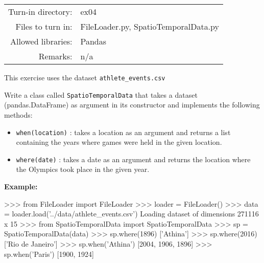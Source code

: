 \documentclass[]{article}
\newenvironment{Shaded}{\begin{snugshade}}{\end{snugshade}}
\newcommand{\DecValTok}[1]{\textcolor[rgb]{0.96,0.45,0.00}{#1}}
\newcommand{\ImportTok}[1]{\textcolor[rgb]{0.15,0.68,0.38}{#1}}
\newcommand{\NormalTok}[1]{\textcolor[rgb]{0.81,0.81,0.76}{#1}}
\newcommand{\OperatorTok}[1]{\textcolor[rgb]{0.81,0.81,0.76}{#1}}
\newcommand{\StringTok}[1]{\textcolor[rgb]{0.96,0.31,0.31}{#1}}
\begin{document}
\begin{longtable}[]{@{}rl@{}}
\toprule
\endhead
Turn-in directory: & ex04\tabularnewline
Files to turn in: & FileLoader.py, SpatioTemporalData.py\tabularnewline
Allowed libraries: & Pandas\tabularnewline
Remarks: & n/a\tabularnewline
\bottomrule
\end{longtable}

This exercise uses the dataset \texttt{athlete\_events.csv}

Write a class called \texttt{SpatioTemporalData} that takes a dataset
(pandas.DataFrame) as argument in its constructor and implements the
following methods:

\begin{itemize}
\item
  \texttt{when(location)} : takes a location as an argument and returns
  a list containing the years where games were held in the given
  location.
\item
  \texttt{where(date)} : takes a date as an argument and returns the
  location where the Olympics took place in the given year.
\end{itemize}

\textbf{Example:}

\begin{Shaded}
\begin{Highlighting}[]
\OperatorTok{>>>} \ImportTok{from}\NormalTok{ FileLoader }\ImportTok{import}\NormalTok{ FileLoader}
\OperatorTok{>>>}\NormalTok{ loader }\OperatorTok{=}\NormalTok{ FileLoader()}
\OperatorTok{>>>}\NormalTok{ data }\OperatorTok{=}\NormalTok{ loader.load(}\StringTok{'../data/athlete_events.csv'}\NormalTok{)}
\NormalTok{Loading dataset of dimensions }\DecValTok{271116}\NormalTok{ x }\DecValTok{15}
\OperatorTok{>>>} \ImportTok{from}\NormalTok{ SpatioTemporalData }\ImportTok{import}\NormalTok{ SpatioTemporalData}
\OperatorTok{>>>}\NormalTok{ sp }\OperatorTok{=}\NormalTok{ SpatioTemporalData(data)}
\OperatorTok{>>>}\NormalTok{ sp.where(}\DecValTok{1896}\NormalTok{)}
\NormalTok{[}\StringTok{'Athina'}\NormalTok{]}
\OperatorTok{>>>}\NormalTok{ sp.where(}\DecValTok{2016}\NormalTok{)}
\NormalTok{[}\StringTok{'Rio de Janeiro'}\NormalTok{]}
\OperatorTok{>>>}\NormalTok{ sp.when(}\StringTok{'Athina'}\NormalTok{)}
\NormalTok{[}\DecValTok{2004}\NormalTok{, }\DecValTok{1906}\NormalTok{, }\DecValTok{1896}\NormalTok{]}
\OperatorTok{>>>}\NormalTok{ sp.when(}\StringTok{'Paris'}\NormalTok{)}
\NormalTok{[}\DecValTok{1900}\NormalTok{, }\DecValTok{1924}\NormalTok{]}
\end{Highlighting}
\end{Shaded}
\end{document}
